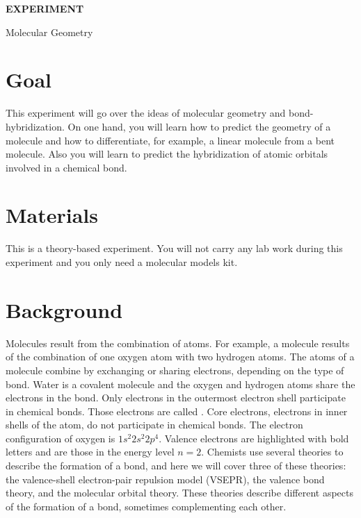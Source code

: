\documentclass[cover.tex]{subfiles}
\begin{document}
 \begin{refsection}


\hfill
\vspace{0.2cm}
\begin{center}
{\large \bfseries 
EXPERIMENT 
\par
\Huge
Molecular Geometry
\\[5pt] \par}
\vspace{0.2cm}
\end{center}
\par
\noindent
\section*{Goal}
This experiment will go over the ideas of molecular geometry and bond-hybridization. On one hand, you will learn how to predict the geometry of a molecule and how to differentiate, for example, a linear molecule from a bent molecule. Also you will learn to predict the hybridization of atomic orbitals involved in a chemical bond.
\section*{Materials}
This is a theory-based experiment. You will not carry any lab work during this experiment and you only need a molecular models kit. 
\section*{Background}
Molecules result from the combination of atoms. For example, a  molecule results of the combination of one oxygen atom with two hydrogen atoms. The atoms of a molecule combine by exchanging or sharing electrons, depending on the type of bond. Water is a covalent molecule and the oxygen and hydrogen atoms share the electrons in the bond. Only electrons in the outermost electron shell participate in chemical bonds. Those electrons are called . Core electrons, electrons in inner shells of the atom, do not participate in chemical bonds. The electron configuration of oxygen is $1s^2$\textbf{$2s^2 2p^4$}. Valence electrons are highlighted with bold letters and are those in the energy level $n=2$. Chemists use several theories to describe the formation of a bond, and here we will cover three of these theories: the valence-shell electron-pair repulsion model (VSEPR), the valence bond theory, and the molecular orbital theory. These theories describe different aspects of the formation of a bond, sometimes complementing each other.



\end{refsection}
\end{document}
